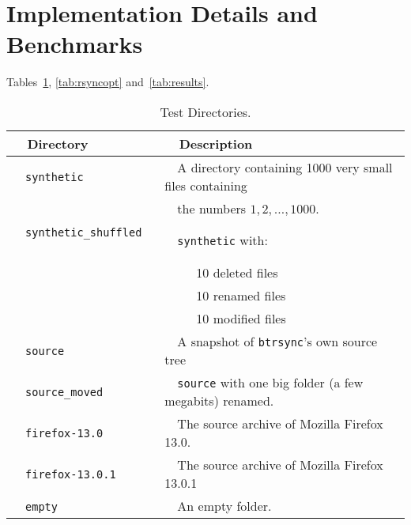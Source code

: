 \documentclass[11pt]{llncs}
\newcommand{\btrsync}{\texttt{btrsync}\xspace}
\begin{document}
\section{Implementation Details and Benchmarks}

Tables~\ref{tab:benchdirec}, \ref{tab:rsyncopt} and~\ref{tab:results}.

\begin{table}
\begin{center}
\begin{tabular}{ll}\toprule
~~{\bf Directory}              ~~&~~{\bf Description}\\\midrule
~~{\tt synthetic}              ~~&~~A directory containing 1000 very small files containing~~\\
~~                             ~~&~~the numbers $1,2,\ldots,1000$. \\
~~{\tt synthetic\_shuffled}    ~~&~~{\tt synthetic} with:\\
                             ~~& ~~~~~10 deleted files\\
                             ~~& ~~~~~10 renamed files \\
                             ~~& ~~~~~10 modified files \\
~~{\tt source}                 ~~& ~~A snapshot of \btrsync's own source tree \\
~~{\tt source\_moved}          ~~& ~~{\tt source} with one big folder (a few megabits) renamed.~~\\
~~{\tt firefox-13.0}           ~~& ~~The source archive of Mozilla Firefox 13.0.\\
~~{\tt firefox-13.0.1}         ~~& ~~The source archive of Mozilla Firefox 13.0.1\\
~~{\tt empty}                  ~~& ~~An empty folder.\\\bottomrule
\end{tabular}\smallskip
  \caption{Test Directories.}
  \label{tab:benchdirec}
\end{center}
\end{table}
\end{document}
